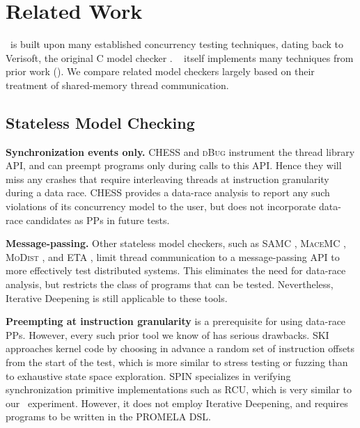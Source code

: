 \section{Related Work}


\quicksand~is built upon many established concurrency testing techniques, dating back
to Verisoft, the original C model checker \cite{verisoft}.
\landslide~\cite{landslide} itself implements many techniques from prior work (\sect{\ref{sec:landslide}}).
We compare related model checkers largely based on their treatment of shared-memory thread communication.

\subsection{Stateless Model Checking}

{\bf Synchronization events only.} CHESS \cite{chess} and \textsc{dBug} \cite{dbug-ssv} instrument the thread library API, and can preempt programs only during calls to this API.
Hence they will miss any crashes that require interleaving threads at instruction granularity during a data race. CHESS provides a data-race analysis to report any such violations of its concurrency model to the user, but does not incorporate data-race candidates as PPs in future tests.

{\bf Message-passing.} Other stateless model checkers, such as SAMC \cite{samc}, \textsc{MaceMC} \cite{macemc}, \textsc{MoDist} \cite{modist}, and ETA \cite{dbug-retreat}, limit thread communication to a message-passing API to more effectively test distributed systems.
This eliminates the need for data-race analysis, but restricts the class of programs that can be tested.
Nevertheless, Iterative Deepening is still applicable to these tools.

{\bf Preempting at instruction granularity} is a prerequisite for using data-race PPs. However, every such prior tool we know of has serious drawbacks.
{\textsc SKI} \cite{ski} approaches kernel code by choosing in advance a random set of instruction offsets from the start of the test,
which is more similar to stress testing or fuzzing than to exhaustive state space exploration.
SPIN \cite{spin} specializes in verifying synchronization primitive implementations such as RCU, which is very similar to our \mxtest~experiment.
However, it does not employ Iterative Deepening, and requires programs to be written in the PROMELA DSL.

